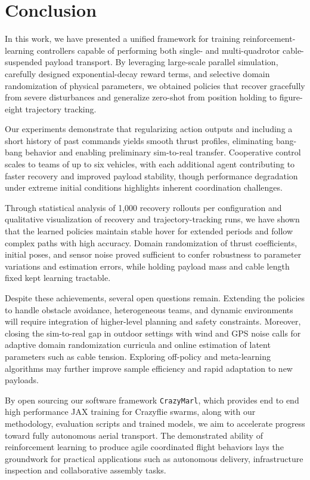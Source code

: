 \chapter{Conclusion}

In this work, we have presented a unified framework for training reinforcement-learning controllers capable of performing both single- and multi-quadrotor cable-suspended payload transport. By leveraging large-scale parallel simulation, carefully designed exponential-decay reward terms, and selective domain randomization of physical parameters, we obtained policies that recover gracefully from severe disturbances and generalize zero-shot from position holding to figure-eight trajectory tracking.

Our experiments demonstrate that regularizing action outputs and including a short history of past commands yields smooth thrust profiles, eliminating bang-bang behavior and enabling preliminary sim-to-real transfer. Cooperative control scales to teams of up to six vehicles, with each additional agent contributing to faster recovery and improved payload stability, though performance degradation under extreme initial conditions highlights inherent coordination challenges.

Through statistical analysis of 1,000 recovery rollouts per configuration and qualitative visualization of recovery and trajectory-tracking runs, we have shown that the learned policies maintain stable hover for extended periods and follow complex paths with high accuracy. Domain randomization of thrust coefficients, initial poses, and sensor noise proved sufficient to confer robustness to parameter variations and estimation errors, while holding payload mass and cable length fixed kept learning tractable.

Despite these achievements, several open questions remain. Extending the policies to handle obstacle avoidance, heterogeneous teams, and dynamic environments will require integration of higher-level planning and safety constraints. Moreover, closing the sim-to-real gap in outdoor settings with wind and GPS noise calls for adaptive domain randomization curricula and online estimation of latent parameters such as cable tension. Exploring off-policy and meta-learning algorithms may further improve sample efficiency and rapid adaptation to new payloads.

By open sourcing our software framework \texttt{CrazyMarl}, which provides end to end high performance JAX training for Crazyflie swarms, along with our methodology, evaluation scripts and trained models, we aim to accelerate progress toward fully autonomous aerial transport. The demonstrated ability of reinforcement learning to produce agile coordinated flight behaviors lays the groundwork for practical applications such as autonomous delivery, infrastructure inspection and collaborative assembly tasks.